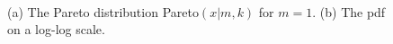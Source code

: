 \documentclass[graybox, envcountchap, twocolumn]{styles/svmult}
\begin{document}
\begin{figure}[hbtp]
\centering
{} \\
\caption{(a) The Pareto distribution Pareto$(x|m, k)$ for $m=1$. (b) The pdf on a log-log scale.}
\label{fig:Pareto-distribution} 
\end{figure}
\end{document}
